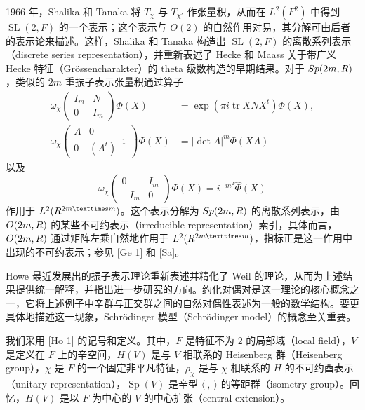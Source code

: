 1966 年，Shalika 和 Tanaka 将 $T_\chi$ 与 $T_{\chi'}$ 作张量积，从而在 $L^2(F^2)$ 中得到 $\operatorname{SL}(2,F)$ 的一个表示；这个表示与 $O(2)$ 的自然作用对易，其分解可由后者的表示论来描述。这样，Shalika 和 Tanaka 构造出 $\operatorname{SL}(2,F)$ 的离散系列表示（discrete series representation），并重新表述了 Hecke 和 Maass 关于带广义 Hecke 特征（Grössencharakter）的 theta 级数构造的早期结果。对于 $Sp(2m,R)$，类似的 $2m$ 重振子表示张量积通过算子
\begin{equation}
\begin{aligned}
 \omega_\chi\!\begin{pmatrix}I_m&N\\0&I_m\end{pmatrix}\Phi(X)
 &=\exp(\pi i\operatorname{tr}XNX^t)\Phi(X),\\
 \omega_\chi\!\begin{pmatrix}A&0\\0&(A^t)^{-1}\end{pmatrix}\Phi(X)
 &=|\det A|^m\Phi(XA)
\end{aligned}\tag{1.1}
\end{equation}
以及
\begin{equation}
 \omega_\chi\!\begin{pmatrix}0&I_m\\-I_m&0\end{pmatrix}\Phi(X)
 =i^{-m^2}\widehat\Phi(X)\tag{1.2}
\end{equation}
作用于 $L^2(\R^{2m\times m})$。这个表示分解为 $Sp(2m,R)$ 的离散系列表示，由 $O(2m,R)$ 的某些不可约表示（irreducible representation）索引，具体而言，$O(2m,R)$ 通过矩阵左乘自然地作用于 $L^2(\R^{2m\times m})$，指标正是这一作用中出现的不可约表示；参见 [Ge 1] 和 [Sa]。

Howe 最近发展出的振子表示理论重新表述并精化了 Weil 的理论，从而为上述结果提供统一解释，并指出进一步研究的方向。约化对偶对是这一理论的核心概念之一，它将上述例子中辛群与正交群之间的自然对偶性表述为一般的数学结构。要更具体地描述这一现象，Schrödinger 模型（Schrödinger model）的概念至关重要。

我们采用 [Ho 1] 的记号和定义。其中，$F$ 是特征不为 $2$ 的局部域（local field），$V$ 是定义在 $F$ 上的辛空间，$H(V)$ 是与 $V$ 相联系的 Heisenberg 群（Heisenberg group），$\chi$ 是 $F$ 的一个固定非平凡特征，$\rho_\chi$ 是与 $\chi$ 相联系的 $H$ 的不可约酉表示（unitary representation），$\operatorname{Sp}(V)$ 是辛型 $\langle\ ,\ \rangle$ 的等距群（isometry group）。回忆，$H(V)$ 是以 $F$ 为中心的 $V$ 的中心扩张（central extension）。

